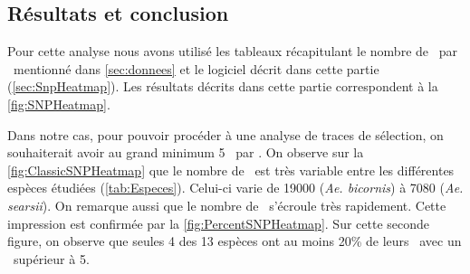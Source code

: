 \documentclass[../main]{subfiles} %
\begin{document}
\subsection{Résultats et conclusion}
\label{sec:SNP_Results}
Pour cette analyse nous avons utilisé les tableaux récapitulant le nombre de \SNP par \contig mentionné dans \ref{sec:donnees} et le logiciel décrit dans cette partie (\cref{sec:SnpHeatmap}). Les résultats décrits dans cette partie correspondent à la \cref{fig:SNPHeatmap}.

Dans notre cas, pour pouvoir procéder à une analyse de  traces de sélection, on souhaiterait avoir au grand minimum 5 \SNP par \contigs.
On observe sur la \cref{fig:ClassicSNPHeatmap} que le nombre de \contigs est très variable entre les différentes espèces étudiées (\ref{tab:Especes}). Celui-ci varie de \num{19 000} (\textit{Ae. bicornis}) à \num{7 080} (\textit{Ae. searsii}). On remarque aussi que le nombre de \SNP s'écroule très rapidement. Cette impression est confirmée par la \cref{fig:PercentSNPHeatmap}. Sur cette seconde figure, on observe que seules 4 des 13 espèces ont au moins 20\% de leurs \contigs avec un \NbSNP supérieur à \num{5}. 


\end{document}
